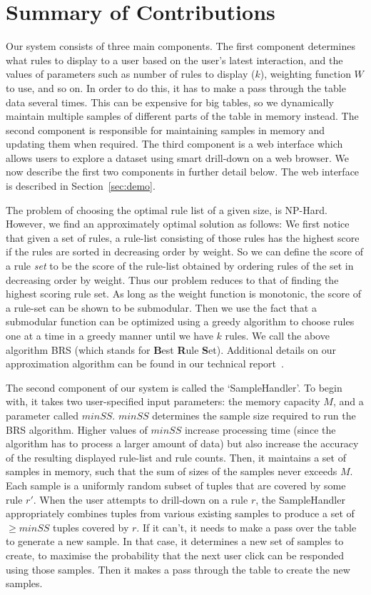 
\section{Summary of Contributions}\label{sec:summary}

Our system consists of three main components. The first component determines what rules to display to a user based on the user's latest interaction, and the values of parameters such as number of rules to display ($k$), weighting function $W$ to use, and so on. In order to do this, it has to make a pass through the table data several times. This can be expensive for big tables, so we dynamically maintain multiple samples of different parts of the table in memory instead. The second component is responsible for maintaining samples in memory and updating them when required. The third component is a web interface which allows users to explore a dataset using smart drill-down on a web browser. We now describe the first two components in further detail below. The web interface is described in Section~\ref{sec:demo}.

The problem of choosing the optimal rule list of a given size, is NP-Hard. However, we find an approximately optimal solution as follows: We first notice that given a set of rules, a rule-list consisting of those rules has the highest score if the rules are sorted in decreasing order by weight. So we can define the score of a rule {\em set} to be the score of the rule-list obtained by ordering rules of the set in decreasing order by weight. Thus our problem reduces to that of finding the highest scoring rule set. As long as the weight function is monotonic, the score of a rule-set can be shown to be submodular. Then we use the fact that a submodular function can be optimized using a greedy algorithm to choose rules one at a time in a greedy manner until we have $k$ rules. We call the above algorithm BRS (which stands for {\bf B}est {\bf R}ule {\bf S}et). Additional details on our approximation algorithm can be found in our technical report~\cite{tr}. 

The second component of our system is called the `SampleHandler'. To begin with, it takes two user-specified input parameters: the memory capacity $M$, and a parameter called $minSS$. $minSS$ determines the sample size required to run the BRS algorithm. Higher values of $minSS$ increase processing time (since the algorithm has to process a larger amount of data) but also increase the accuracy of the resulting displayed rule-list and rule counts. Then, it maintains a set of samples in memory, such that the sum of sizes of the samples never exceeds $M$. Each sample is a uniformly random subset of tuples that are covered by some rule $r'$. When the user attempts to drill-down on a rule $r$, the SampleHandler appropriately combines tuples from various existing samples to produce a set of $\geq minSS$ tuples covered by $r$. If it can't, it needs to make a pass over the table to generate a new sample. In that case, it determines a new set of samples to create, to maximise the probability that the next user click can be responded using those samples. Then it makes a pass through the table to create the new samples. 
